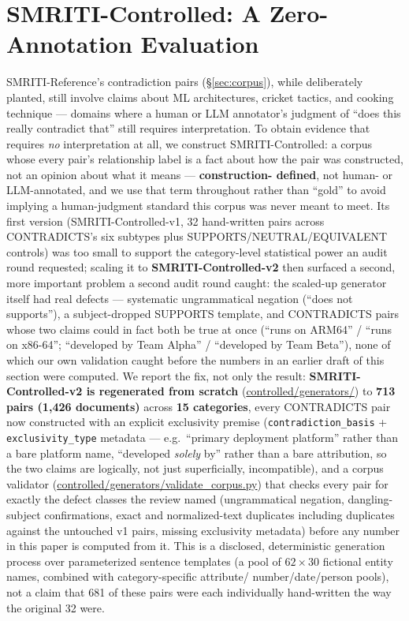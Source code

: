 \section{SMRITI-Controlled: A Zero-Annotation Evaluation}
\label{sec:controlled}

SMRITI-Reference's contradiction pairs (\S\ref{sec:corpus}), while
deliberately planted, still involve claims about ML architectures,
cricket tactics, and cooking technique --- domains where a human or LLM
annotator's judgment of ``does this really contradict that'' still
requires interpretation. To obtain evidence that requires \emph{no}
interpretation at all, we construct SMRITI-Controlled: a corpus whose
every pair's relationship label is a fact about how the pair was
constructed, not an opinion about what it means --- \textbf{construction-
defined}, not human- or LLM-annotated, and we use that term throughout
rather than ``gold'' to avoid implying a human-judgment standard this
corpus was never meant to meet. Its first version (SMRITI-Controlled-v1,
32 hand-written pairs across CONTRADICTS's six subtypes plus
SUPPORTS/NEUTRAL/EQUIVALENT controls) was too small to support the
category-level statistical power an audit round requested; scaling
it to \textbf{SMRITI-Controlled-v2} then surfaced a second, more
important problem a second audit round caught: the scaled-up
generator itself had real defects --- systematic ungrammatical negation
(``does not supports''), a subject-dropped SUPPORTS template, and
CONTRADICTS pairs whose two claims could in fact both be true at once
(``runs on ARM64'' / ``runs on x86-64''; ``developed by Team Alpha'' /
``developed by Team Beta''), none of which our own validation caught
before the numbers in an earlier draft of this section were computed.
We report the fix, not only the result: \textbf{SMRITI-Controlled-v2 is
regenerated from scratch} (\url{controlled/generators/}) to
\textbf{713 pairs (1{,}426 documents)} across \textbf{15 categories},
every CONTRADICTS pair now constructed with an explicit exclusivity
premise (\texttt{contradiction\_basis} + \texttt{exclusivity\_type}
metadata --- e.g.\ ``primary deployment platform'' rather than a bare
platform name, ``developed \emph{solely} by'' rather than a bare
attribution, so the two claims are logically, not just superficially,
incompatible), and a corpus validator
(\url{controlled/generators/validate_corpus.py}) that
checks every pair for exactly the defect classes the review named
(ungrammatical negation, dangling-subject confirmations, exact and
normalized-text duplicates including duplicates against the untouched
v1 pairs, missing exclusivity metadata) before any number in this paper
is computed from it. This is a disclosed, deterministic generation
process over parameterized sentence templates (a pool of $62 \times 30$
fictional entity names, combined with category-specific attribute/
number/date/person pools), not a claim that 681 of these pairs were each
individually hand-written the way the original 32 were.

